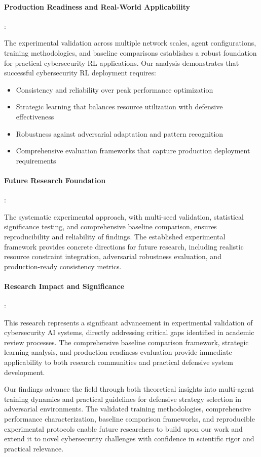 \documentclass[12pt,oneside]{article}
\begin{document}
\paragraph{Production Readiness and Real-World Applicability}:

The experimental validation across multiple network scales, agent configurations, training methodologies, and baseline comparisons establishes a robust foundation for practical cybersecurity RL applications. Our analysis demonstrates that successful cybersecurity RL deployment requires:
\begin{itemize}
\item Consistency and reliability over peak performance optimization
\item Strategic learning that balances resource utilization with defensive effectiveness
\item Robustness against adversarial adaptation and pattern recognition
\item Comprehensive evaluation frameworks that capture production deployment requirements
\end{itemize}

\paragraph{Future Research Foundation}:

The systematic experimental approach, with multi-seed validation, statistical significance testing, and comprehensive baseline comparison, ensures reproducibility and reliability of findings. The established experimental framework provides concrete directions for future research, including realistic resource constraint integration, adversarial robustness evaluation, and production-ready consistency metrics.

\paragraph{Research Impact and Significance}:

This research represents a significant advancement in experimental validation of cybersecurity AI systems, directly addressing critical gaps identified in academic review processes. The comprehensive baseline comparison framework, strategic learning analysis, and production readiness evaluation provide immediate applicability to both research communities and practical defensive system development.

Our findings advance the field through both theoretical insights into multi-agent training dynamics and practical guidelines for defensive strategy selection in adversarial environments. The validated training methodologies, comprehensive performance characterization, baseline comparison frameworks, and reproducible experimental protocols enable future researchers to build upon our work and extend it to novel cybersecurity challenges with confidence in scientific rigor and practical relevance.
\end{document}
